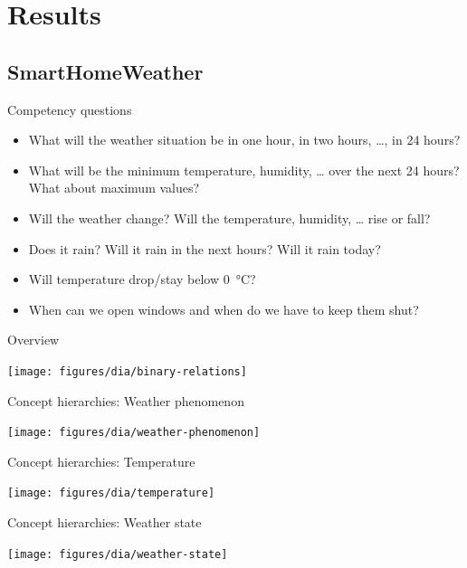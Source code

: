 \documentclass{beamer}
\begin{document}
\section{Results}

\subsection{SmartHomeWeather}

\begin{frame}{Competency questions}
	\begin{itemize}
		\item What will the weather situation be in one hour, in two hours, …, in 24 hours?
		\item What will be the minimum temperature, humidity, … over the next 24 hours? What about maximum values?
		\item Will the weather change? Will the temperature, humidity, … rise or fall?
		\item Does it rain? Will it rain in the next hours? Will it rain today?
		\item Will temperature drop/stay below \SI{0}{\celsius}?
		\item When can we open windows and when do we have to keep them shut?
	\end{itemize}
\end{frame}

\begin{frame}{Overview}
	\begin{center}
		\texttt{[image: figures/dia/binary-relations]}
	\end{center}
\end{frame}

\begin{frame}{Concept hierarchies: Weather phenomenon}
	\begin{center}
		\texttt{[image: figures/dia/weather-phenomenon]}
	\end{center}
\end{frame}

\begin{frame}{Concept hierarchies: Temperature}
	\begin{center}
		\texttt{[image: figures/dia/temperature]}
	\end{center}
\end{frame}

\begin{frame}{Concept hierarchies: Weather state}
	\begin{center}
		\texttt{[image: figures/dia/weather-state]}
	\end{center}
\end{frame}
\end{document}
